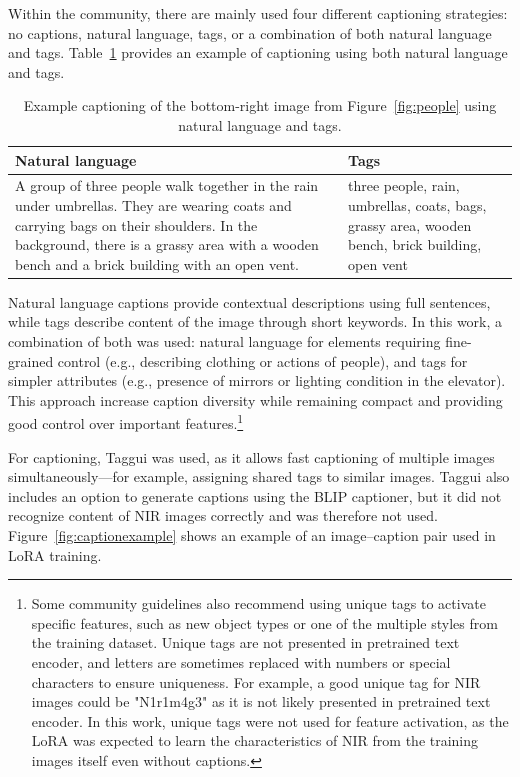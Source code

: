 Within the community, there are mainly used four different captioning strategies: no captions, natural language, tags, or a combination of both natural language and tags. Table~\ref{tab:captionexample} provides an example of captioning using both natural language and tags.


 \begin{table}[h]
        \caption{Example captioning of the bottom-right image from Figure~\ref{fig:people} using natural language and tags.}
    \label{tab:captionexample}
    \centering
    \begin{tabular}{|p{}|p{}|}
    \hline
         Natural language & Tags \\ \hline
          A group of three people walk together in the rain under umbrellas. They are wearing coats and carrying bags on their shoulders. In the background, there is a grassy area with a wooden bench and a brick building with an open vent. & three people, rain, umbrellas, coats, bags, grassy area, wooden bench, brick building, open vent \\ \hline
    \end{tabular}
\end{table}

Natural language captions provide contextual descriptions using full sentences, while tags describe content of the image through short keywords. In this work, a combination of both was used: natural language for elements requiring fine-grained control (e.g., describing clothing or actions of people), and tags for simpler attributes (e.g., presence of mirrors or lighting condition in the elevator). This approach increase caption diversity while remaining compact and providing good control over important features.\footnote{Some community guidelines also recommend using unique tags to activate specific features, such as new object types or one of the multiple styles from the training dataset. Unique tags are not presented in pretrained text encoder, and letters are sometimes replaced with numbers or special characters to ensure uniqueness. For example, a good unique tag for NIR images could be "N1r1m4g3" as it is not likely presented in pretrained text encoder. In this work, unique tags were not used for feature activation, as the LoRA was expected to learn the characteristics of NIR from the training images itself even without captions.}

For captioning, Taggui was used, as it allows fast captioning of multiple images simultaneously—for example, assigning shared tags to similar images. Taggui also includes an option to generate captions using the BLIP captioner, but it did not recognize content of NIR images correctly and was therefore not used. Figure~\ref{fig:captionexample} shows an example of an image–caption pair used in LoRA training.

